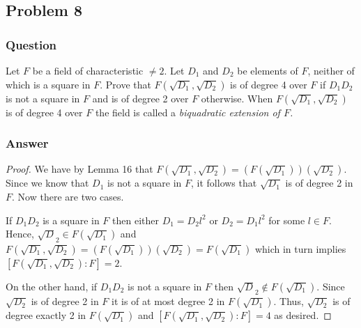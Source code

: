 \documentclass[10pt]{article}
\begin{document}
\subsection{Problem 8}
\subsubsection{Question}
Let $F$ be a field of characteristic $\neq 2$. Let $D_1$ and $D_2$ be elements of $F$, neither of which is a square in $F$. Prove that $F(\sqrt{D_1}, \sqrt{D_2}) $ is of degree 4 over $F$ if $D_1 D_2$ is not a square in $F$ and is of degree 2 over $F$ otherwise. When $F(\sqrt{D_1}, \sqrt{D_2})$ is of degree 4 over $F$ the field is called a \emph{biquadratic extension of $F$.}
\subsubsection{Answer}
\begin{proof}
We have by Lemma 16 that $F(\sqrt{D_1}, \sqrt{D_2}) = (F(\sqrt{D_1}))( \sqrt{D_2}) $. Since we know that $D_1$ is not a square in $F$, it follows that $\sqrt{D_1}$ is of degree 2 in $F$. Now there are two cases. 

If $D_1D_2$ is a square in $F$ then either $D_1=D_2 l^2$ or  $D_2=D_1 l^2$ for some $l \in F$. Hence, $\sqrt D_2 \in F(\sqrt{D_1})$ and $F(\sqrt{D_1}, \sqrt{D_2}) = (F(\sqrt{D_1}))( \sqrt{D_2}) =F(\sqrt{D_1})$ which in turn implies $[F(\sqrt{D_1}, \sqrt{D_2}):F]=2$.

On the other hand, if $D_1 D_2$ is not a square in $F$ then  $\sqrt D_2 \notin F(\sqrt{D_1})$. Since $\sqrt{D_2}$ is of degree 2 in $F$ it is of at most degree 2 in $F(\sqrt{D_1})$. Thus, $\sqrt{D_2}$ is of degree exactly 2 in  $F(\sqrt{D_1})$ and $[F(\sqrt{D_1}, \sqrt{D_2}):F]=4$ as desired.
\end{proof}
\end{document}
